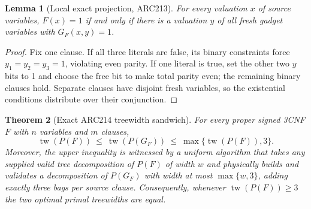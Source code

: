 \documentclass[11pt]{article}
\newtheorem{theorem}{Theorem}
\newtheorem{lemma}[theorem]{Lemma}
\begin{document}
\begin{lemma}[Local exact projection, ARC213]
For every valuation $x$ of source variables, $F(x)=1$ if and only if there is a valuation $y$ of all fresh gadget variables with $G_F(x,y)=1$.
\end{lemma}
\begin{proof}
Fix one clause. If all three literals are false, its binary constraints force $y_1=y_2=y_3=1$, violating even parity. If one literal is true, set the other two $y$ bits to 1 and choose the free bit to make total parity even; the remaining binary clauses hold. Separate clauses have disjoint fresh variables, so the existential conditions distribute over their conjunction.\end{proof}

\begin{theorem}[Exact ARC214 treewidth sandwich]
For every proper signed 3CNF $F$ with $n$ variables and $m$ clauses,
\[
 \boxed{\operatorname{tw}(P(F))\ \le\ \operatorname{tw}(P(G_F))\ \le\ \max\{\operatorname{tw}(P(F)),3\}.}
\]
Moreover, the upper inequality is witnessed by a uniform algorithm that takes \emph{any supplied valid tree decomposition} of $P(F)$ of width $w$ and physically builds and validates a decomposition of $P(G_F)$ with width at most $\max\{w,3\}$, adding exactly three bags per source clause. Consequently, whenever $\operatorname{tw}(P(F))\ge3$ the two optimal primal treewidths are \emph{equal}.
\end{theorem}
\end{document}
